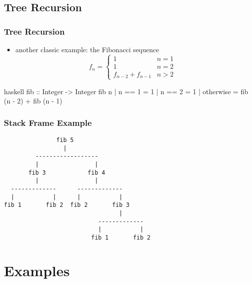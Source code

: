 \documentclass[dvipsnames]{beamer}
\theoremstyle{plain}
\begin{document}
\subsection{Tree Recursion}

\begin{frame}[fragile]
  \frametitle{Tree Recursion}

  \begin{itemize}
    \item another classic example: the Fibonacci sequence
    \begin{equation*}
      f_n = \left\{
        \begin{array}{ll}
          1                 & n = 1\\
          1                 & n = 2\\
          f_{n-2} + f_{n-1} & n > 2
        \end{array}\right.
    \end{equation*}
  \end{itemize}

  \begin{exampleblock}{}
    \begin{pygments}{haskell}
fib :: Integer -> Integer
fib n
  | n == 1    = 1
  | n == 2    = 1
  | otherwise = fib (n - 2) + fib (n - 1)
    \end{pygments}
  \end{exampleblock}
\end{frame}

\begin{frame}[fragile]
  \frametitle{Stack Frame Example}

  \begin{verbatim}
               fib 5
                 |
         ------------------
         |                |
       fib 3            fib 4
         |                |
  -------------      -------------
  |           |      |           |
fib 1       fib 2  fib 2       fib 3
                                 |
                           -------------
                           |           |
                         fib 1       fib 2
  \end{verbatim}
\end{frame}

\section{Examples}
\end{document}
